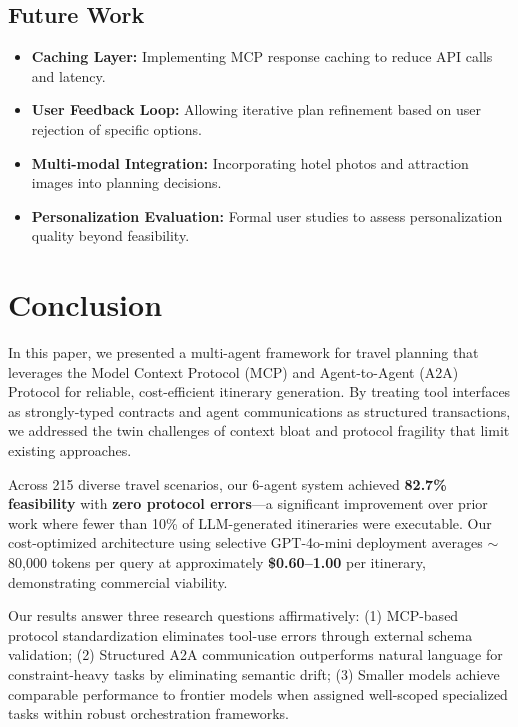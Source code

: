 \documentclass[preprint,review,12pt]{elsarticle}
\begin{document}
\subsection{Future Work}

\begin{itemize}
    \item \textbf{Caching Layer:} Implementing MCP response caching to reduce API calls and latency.
    \item \textbf{User Feedback Loop:} Allowing iterative plan refinement based on user rejection of specific options.
    \item \textbf{Multi-modal Integration:} Incorporating hotel photos and attraction images into planning decisions.
    \item \textbf{Personalization Evaluation:} Formal user studies to assess personalization quality beyond feasibility.
\end{itemize}

\section{Conclusion}
\label{sec:conclusion}

In this paper, we presented a multi-agent framework for travel planning that leverages the Model Context Protocol (MCP) and Agent-to-Agent (A2A) Protocol for reliable, cost-efficient itinerary generation. By treating tool interfaces as strongly-typed contracts and agent communications as structured transactions, we addressed the twin challenges of context bloat and protocol fragility that limit existing approaches.

Across 215 diverse travel scenarios, our 6-agent system achieved \textbf{82.7\% feasibility} with \textbf{zero protocol errors}---a significant improvement over prior work where fewer than 10\% of LLM-generated itineraries were executable. Our cost-optimized architecture using selective GPT-4o-mini deployment averages $\sim$80,000 tokens per query at approximately \textbf{\$0.60--1.00} per itinerary, demonstrating commercial viability.

Our results answer three research questions affirmatively: (1) MCP-based protocol standardization eliminates tool-use errors through external schema validation; (2) Structured A2A communication outperforms natural language for constraint-heavy tasks by eliminating semantic drift; (3) Smaller models achieve comparable performance to frontier models when assigned well-scoped specialized tasks within robust orchestration frameworks.
\end{document}
